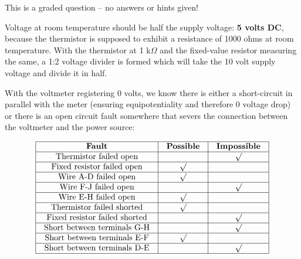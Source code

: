\vfil 

\eject






This is a graded question -- no answers or hints given!







Voltage at room temperature should be half the supply voltage: {\bf 5 volts DC}, because the thermistor is supposed to exhibit a resistance of 1000 ohms at room temperature.  With the thermistor at 1 k$\Omega$ and the fixed-value resistor measuring the same, a 1:2 voltage divider is formed which will take the 10 volt supply voltage and divide it in half.

\vskip 10pt

With the voltmeter registering 0 volts, we know there is either a short-circuit in parallel with the meter (ensuring equipotentiality and therefore 0 voltage drop) or there is an open circuit fault somewhere that severs the connection between the voltmeter and the power source:


$$\vbox{\offinterlineskip
\halign{\strut
\vrule \quad\hfil # \ \hfil & 
\vrule \quad\hfil # \ \hfil & 
\vrule \quad\hfil # \ \hfil \vrule \cr
\noalign{\hrule}
%
{\bf Fault} & {\bf Possible} & {\bf Impossible} \cr
%
\noalign{\hrule}
%
Thermistor failed open &  & $\surd$ \cr
%
\noalign{\hrule}
%
Fixed resistor failed open & $\surd$ &  \cr
%
\noalign{\hrule}
%
Wire A-D failed open & $\surd$ &  \cr
%
\noalign{\hrule}
%
Wire F-J failed open &  & $\surd$ \cr
%
\noalign{\hrule}
%
Wire E-H failed open & $\surd$ &  \cr
%
\noalign{\hrule}
%
Thermistor failed shorted & $\surd$ &  \cr
%
\noalign{\hrule}
%
Fixed resistor failed shorted &  & $\surd$ \cr
%
\noalign{\hrule}
%
Short between terminals G-H &  & $\surd$ \cr
%
\noalign{\hrule}
%
Short between terminals E-F & $\surd$ &  \cr
%
\noalign{\hrule}
%
Short between terminals D-E &  & $\surd$ \cr
%
\noalign{\hrule}
} %
}$$ %






